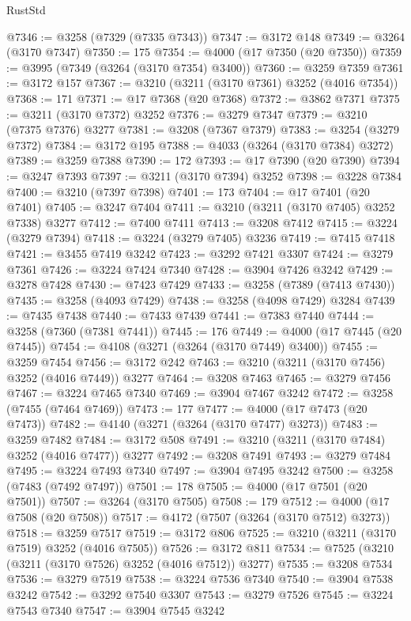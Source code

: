 \begin{lexlean}{RustStd}
\begin{coremodule}
@7346 := @3258 (@7329 (@7335 @7343))
@7347 := @3172 @148
@7349 := @3264 (@3170 @7347)
@7350 := 175
@7354 := @4000 (@17 @7350 (@20 @7350))
@7359 := @3995 (@7349 (@3264 (@3170 @7354) @3400))
@7360 := @3259 @7359
@7361 := @3172 @157
@7367 := @3210 (@3211 (@3170 @7361) @3252 (@4016 @7354))
@7368 := 171
@7371 := @17 @7368 (@20 @7368)
@7372 := @3862 @7371
@7375 := @3211 (@3170 @7372) @3252
@7376 := @3279 @7347
@7379 := @3210 (@7375 @7376) @3277
@7381 := @3208 (@7367 @7379)
@7383 := @3254 (@3279 @7372)
@7384 := @3172 @195
@7388 := @4033 (@3264 (@3170 @7384) @3272)
@7389 := @3259 @7388
@7390 := 172
@7393 := @17 @7390 (@20 @7390)
@7394 := @3247 @7393
@7397 := @3211 (@3170 @7394) @3252
@7398 := @3228 @7384
@7400 := @3210 (@7397 @7398)
@7401 := 173
@7404 := @17 @7401 (@20 @7401)
@7405 := @3247 @7404
@7411 := @3210 (@3211 (@3170 @7405) @3252 @7338) @3277
@7412 := @7400 @7411
@7413 := @3208 @7412
@7415 := @3224 (@3279 @7394)
@7418 := @3224 (@3279 @7405) @3236
@7419 := @7415 @7418
@7421 := @3455 @7419 @3242
@7423 := @3292 @7421 @3307
@7424 := @3279 @7361
@7426 := @3224 @7424 @7340
@7428 := @3904 @7426 @3242
@7429 := @3278 @7428
@7430 := @7423 @7429
@7433 := @3258 (@7389 (@7413 @7430))
@7435 := @3258 (@4093 @7429)
@7438 := @3258 (@4098 @7429) @3284
@7439 := @7435 @7438
@7440 := @7433 @7439
@7441 := @7383 @7440
@7444 := @3258 (@7360 (@7381 @7441))
@7445 := 176
@7449 := @4000 (@17 @7445 (@20 @7445))
@7454 := @4108 (@3271 (@3264 (@3170 @7449) @3400))
@7455 := @3259 @7454
@7456 := @3172 @242
@7463 := @3210 (@3211 (@3170 @7456) @3252 (@4016 @7449)) @3277
@7464 := @3208 @7463
@7465 := @3279 @7456
@7467 := @3224 @7465 @7340
@7469 := @3904 @7467 @3242
@7472 := @3258 (@7455 (@7464 @7469))
@7473 := 177
@7477 := @4000 (@17 @7473 (@20 @7473))
@7482 := @4140 (@3271 (@3264 (@3170 @7477) @3273))
@7483 := @3259 @7482
@7484 := @3172 @508
@7491 := @3210 (@3211 (@3170 @7484) @3252 (@4016 @7477)) @3277
@7492 := @3208 @7491
@7493 := @3279 @7484
@7495 := @3224 @7493 @7340
@7497 := @3904 @7495 @3242
@7500 := @3258 (@7483 (@7492 @7497))
@7501 := 178
@7505 := @4000 (@17 @7501 (@20 @7501))
@7507 := @3264 (@3170 @7505)
@7508 := 179
@7512 := @4000 (@17 @7508 (@20 @7508))
@7517 := @4172 (@7507 (@3264 (@3170 @7512) @3273))
@7518 := @3259 @7517
@7519 := @3172 @806
@7525 := @3210 (@3211 (@3170 @7519) @3252 (@4016 @7505))
@7526 := @3172 @811
@7534 := @7525 (@3210 (@3211 (@3170 @7526) @3252 (@4016 @7512)) @3277)
@7535 := @3208 @7534
@7536 := @3279 @7519
@7538 := @3224 @7536 @7340
@7540 := @3904 @7538 @3242
@7542 := @3292 @7540 @3307
@7543 := @3279 @7526
@7545 := @3224 @7543 @7340
@7547 := @3904 @7545 @3242

\end{coremodule}
\end{lexlean}
